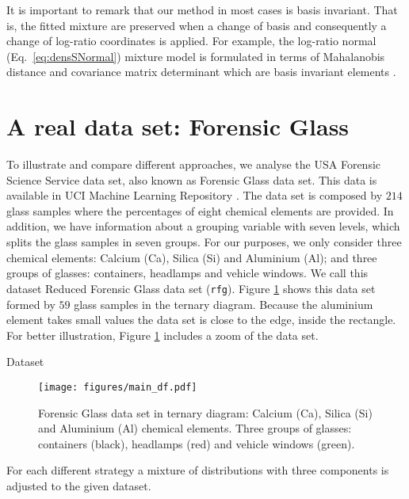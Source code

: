 \documentclass[10pt, a4paper]{article}
\begin{document}
It is important to remark that our method in most cases is basis invariant. That is, the fitted mixture are preserved when a change of basis and consequently a change of log-ratio coordinates is applied. For example, the log-ratio normal (Eq.~\ref{eq:densSNormal}) mixture model is formulated in terms of Mahalanobis distance and covariance matrix determinant which are basis invariant elements
 \citep{barcelo1999comment}.

 

\section{A real data set: Forensic Glass}
\label{example_section}

\noindent To illustrate and compare different approaches, we analyse the USA Forensic Science Service data set, also known as Forensic Glass data set. This data is available in UCI Machine Learning Repository \cite{uci2007repository}.  The data set is composed by  $214$ glass samples where the percentages of eight chemical elements are provided. In addition, we have information about a grouping variable with seven levels, which splits the glass samples in seven groups. For our purposes, we only consider three chemical elements: Calcium (Ca), Silica (Si) and Aluminium (Al); and three groups of glasses: containers, headlamps and vehicle windows. We call this dataset Reduced Forensic Glass data set (\texttt{rfg}). Figure \ref{fig04} shows this data set formed by $59$ glass samples in the ternary diagram. Because the aluminium element takes small values the data set is close to the edge, inside the rectangle. For better illustration, Figure \ref{fig04} includes a zoom of the data set.


\begin{table}
\centering
\scriptsize

\quad

\caption{Dataset}
\label{example_glasses}
\end{table}


\begin{figure}[htbp]
\centering
\texttt{[image: figures/main\_df.pdf]}%
\caption{Forensic Glass data set in ternary diagram: Calcium (Ca), Silica (Si) and Aluminium (Al) chemical elements. Three groups of glasses: containers (black), headlamps (red) and vehicle windows (green).}
\label{fig04}
\end{figure}

For each different strategy a mixture of distributions with three components is adjusted to the given dataset.
\end{document}

